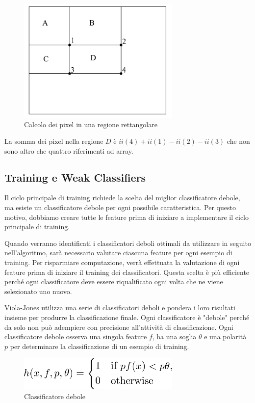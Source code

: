 \begin{figure}[h!]
	\centering
	\includegraphics[width=80mm]{img/4/violahaar_1_4}
	\caption{\fontsize{10px}{0mm}\selectfont Calcolo dei pixel in una regione rettangolare \label{fig:violahaar_1_4}}
\end{figure}

La somma dei pixel nella regione $D$ è $ii(4) + ii (1) - ii (2) - ii (3)$ che non sono altro che quattro riferimenti ad array.\newpage

\subsection{Training e Weak Classifiers}

Il ciclo principale di training richiede la scelta del miglior classificatore debole, ma esiste un classificatore debole per ogni possibile caratteristica. Per questo motivo, dobbiamo creare tutte le feature prima di iniziare a implementare il ciclo principale di training.

Quando verranno identificati i classificatori deboli ottimali da utilizzare in seguito nell'algoritmo, sarà necessario valutare ciascuna feature per ogni esempio di training. Per risparmiare computazione, verrà effettuata la valutazione di ogni feature prima di iniziare il training dei classificatori. Questa scelta è più efficiente perché ogni classificatore deve essere riqualificato ogni volta che ne viene selezionato uno nuovo.

Viola-Jones utilizza una serie di classificatori deboli e pondera i loro risultati insieme per produrre la classificazione finale. Ogni classificatore è "debole" perché da solo non può adempiere con precisione all'attività di classificazione. Ogni classificatore debole osserva una singola feature $f$, ha una soglia $\theta$ e una polarità $p$ per determinare la classificazione di un esempio di training.
\begin{figure}[h!]
	\centering
	\includegraphics[width=80mm]{img/4/violahaar_1_5}
	\caption{\fontsize{10px}{0mm}\selectfont Classificatore debole \label{fig:violahaar_1_5}}
\end{figure}

